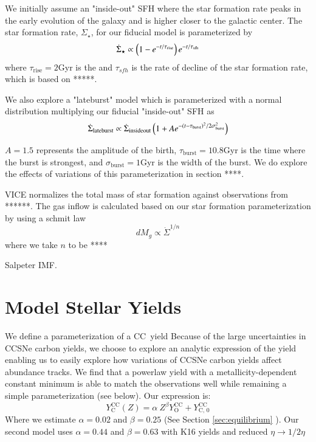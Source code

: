 \documentclass[12pt,oneside]{report}
\begin{document}
We initially assume an "inside-out" SFH where the star formation rate peaks in the early evolution of the galaxy and is higher closer to the galactic center. The star formation rate, $\Sigma_\star$, for our fiducial model is parameterized by
\begin{equation}
    \dot{\Sigma}_\star \propto \left(1-e^{-t/\tau_{\rm rise}}\right) e^{-t/\tau_{\rm sfh}}
\end{equation}
where $\tau_\text{rise}=2$Gyr is the
and $\tau_{sfh}$ is the rate of decline of the star formation rate, which is based on *****.

We also explore a "lateburst" model which is parameterized with a normal distribution multiplying our fiducial "inside-out" SFH as
\begin{equation}\label{eq:lateburst}
    \dot{\Sigma}_{\rm lateburst} \propto \dot{\Sigma}_{\rm insideout} \left(1 + A e^{-(t-\tau_{\rm burst})^2/2\sigma^2_{\rm burst}} \right)
\end{equation}

$A=1.5$ represents the amplitude of the birth, $\tau_\text{burst}=10.8$Gyr is the time where the burst is strongest, and $\sigma_\text{burst}=1$Gyr is the width of the burst. We do explore the effects of variations of this parameterization in section ****.


VICE normalizes the total mass of star formation against observations from ******.
The gas inflow is calculated based on our star formation parameterization by using a schmit law 
\begin{equation}
    dM_g \propto \dot{\Sigma}^{1/n}
\end{equation}
where we take $n$ to be ****

Salpeter IMF.

\section{Model Stellar Yields}
We define a parameterization of a CC~yield
  Because of the large uncertainties in CCSNe carbon yields, we choose to explore an analytic expression of the yield enabling us to easily explore how variations of CCSNe carbon yields affect abundance tracks. We find that a powerlaw yield with a metallicity-dependent constant minimum is able to match the observations well while remaining a simple parameterization (see below). Our expression is:
  \begin{equation}\label{eq:y_yields}
   Y_\text{C}^\text{CC}(Z) =  \alpha\ Z^\beta Y_\text{O}^\text{CC} + Y_\text{C, 0}^\text{CC}
    \end{equation}
   	Where we estimate $\alpha = 0.02$ and $\beta = 0.25$ (See Section \ref{sec:equilibrium} ). Our second model uses $\alpha = 0.44$ and $\beta = 0.63$ with K16 yields and reduced $\eta \rightarrow 1/2 \eta$ 
    
\end{document}
